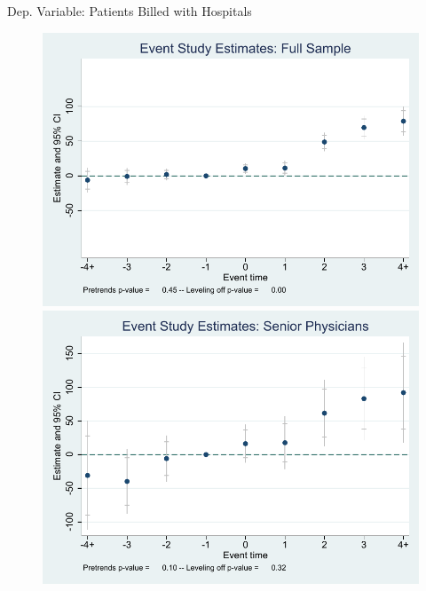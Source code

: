 \documentclass[10pt]{beamer}
\begin{document}
\begin{frame}{Dep. Variable: Patients Billed with Hospitals}
\begin{figure}[ht]
        \begin{minipage}[b]{0.47\linewidth}
            \centering
            \includegraphics[width=\textwidth]{Objects/xtevent_fullsample.pdf}
        \end{minipage}
        \hspace{0.2cm}
        \begin{minipage}[b]{0.47\linewidth}
            \centering
            \includegraphics[width=\textwidth]{Objects/xtevent_oldsample.pdf}
        \end{minipage}
    \end{figure}
\end{frame}
\end{document}
